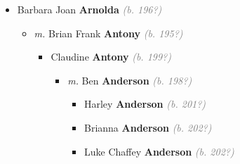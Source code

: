 \documentclass[10pt, openany]{book}
\begin{document}
\begin{itemize}
{\begin{itemize}
{\begin{itemize}
{\begin{itemize}
{\begin{itemize}
{\begin{itemize}
{\begin{itemize}
{\begin{itemize}
{ }
\item{Bianca Jasmine \textbf{Gomes} \textcolor{gray}{\textit{(b. 202?)}}
  }
\end{itemize}}
\end{itemize}
  }
\item{Marisa Jeannelle \textbf{Gomes} \textcolor{gray}{\textit{(b. 199?)}}
\begin{itemize}
\item{\textit{m.} Dimitri \textbf{Dermatis} \textcolor{gray}{\textit{(b. 198?)}}   \label{couple:00001887:00001888} \begin{itemize}
\item{Amelia \textbf{Dermatis} \textcolor{gray}{\textit{(b. 201?)}}
 }
\item{Anastasia Zara \textbf{Dermatis} \textcolor{gray}{\textit{(b. 202?)}}
  }
\item{Alexia Jade \textbf{Dermatis} \textcolor{gray}{\textit{(b. 202?)}}
  }
\end{itemize}}
\end{itemize}
  }
\end{itemize}}
\end{itemize}
 }
\item{Barbara Joan \textbf{Arnolda} \textcolor{gray}{\textit{(b. 196?)}}
\begin{itemize}
\item{\textit{m.} Brian Frank \textbf{Antony} \textcolor{gray}{\textit{(b. 195?)}}   \label{couple:00001892:00001893} \begin{itemize}
\item{Claudine \textbf{Antony} \textcolor{gray}{\textit{(b. 199?)}}
\begin{itemize}
\item{\textit{m.} Ben \textbf{Anderson} \textcolor{gray}{\textit{(b. 198?)}}   \label{couple:00001899:00001900} \begin{itemize}
\item{Harley \textbf{Anderson} \textcolor{gray}{\textit{(b. 201?)}}
 }
\item{Brianna \textbf{Anderson} \textcolor{gray}{\textit{(b. 202?)}}
 }
\item{Luke Chaffey \textbf{Anderson} \textcolor{gray}{\textit{(b. 202?)}}
}
\end{itemize}}
\end{itemize}}
\end{itemize}}
\end{itemize}}
\end{itemize}}
\end{itemize}}
\end{itemize}}
\end{itemize}
\end{document}
